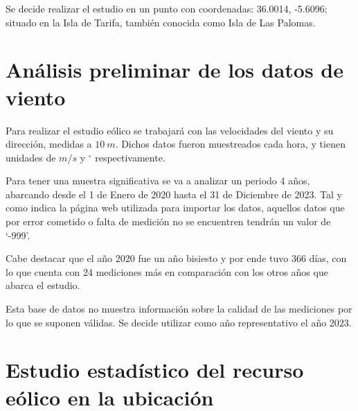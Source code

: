 \documentclass{IEEEtran}
\begin{document}
Se decide realizar el estudio en un punto con coordenadas: 36.0014, -5.6096; situado en la Isla de Tarifa, también conocida como Isla de Las Palomas.

\section{Análisis preliminar de los datos de viento}



Para realizar el estudio eólico se trabajará con las velocidades del viento y su dirección, medidas a $10\ m$. Dichos datos fueron muestreados cada hora, y tienen unidades de $m/s$ y $^\circ$ respectivamente.


Para tener una muestra significativa se va a analizar un periodo 4 años, abarcando desde el 1 de Enero de 2020 hasta el 31 de Diciembre de 2023. Tal y como indica la página web utilizada para importar los datos, aquellos datos que por error cometido o falta de medición no se encuentren tendrán un valor de `-999'.

Cabe destacar que el año 2020 fue un año bisiesto y por ende tuvo 366 días, con lo que cuenta con 24 mediciones más en comparación con los otros años que abarca el estudio.


Esta base de datos no muestra información sobre la calidad de las mediciones por lo que se suponen válidas. Se decide utilizar como año representativo el año 2023.


\section{Estudio estadístico del recurso eólico en la ubicación}
\end{document}
